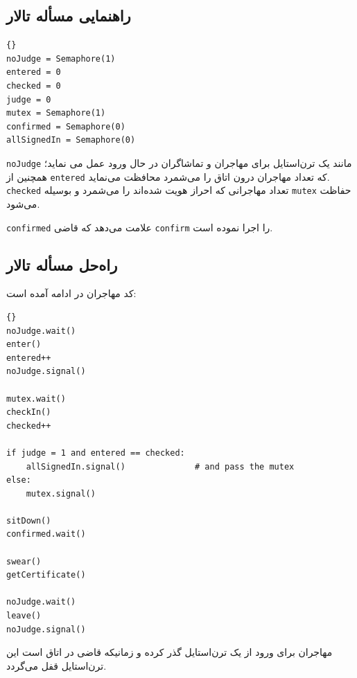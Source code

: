 \documentclass{book}
\newcommand{\clearemptydoublepage}{}%
\begin{document}
\clearemptydoublepage
\subsection{راهنمایی مسأله تالار }

\begin{latin}
\begin{lstlisting}[title=\rl{راهنمایی مسأله تالار \lr{Faneuil}}]{}
noJudge = Semaphore(1)
entered = 0
checked = 0
judge = 0
mutex = Semaphore(1)
confirmed = Semaphore(0)
allSignedIn = Semaphore(0)
\end{lstlisting}
\end{latin}


    {\tt noJudge} 
    مانند یک ترن‌استایل برای مهاجران و تماشاگران در حال ورود عمل می نماید؛ همچنین از {\tt entered} که تعداد مهاجران درون اتاق را می‌شمرد 
    محافظت می‌نماید.  {\tt checked} تعداد مهاجرانی که احراز هویت شده‌اند را می‌شمرد و بوسیله {\tt mutex} حفاظت می‌شود. 

    {\tt confirmed}
    علامت می‌دهد که قاضی {\tt confirm} را اجرا نموده است. 

\clearemptydoublepage
\subsection{راه‌حل مسأله تالار }

    کد مهاجران در ادامه آمده است:

\begin{latin}
\begin{lstlisting}[title=\rl{راهنمایی مسأله تالار \lr{Faneuil} (مهاجر)}]{}
noJudge.wait()
enter()
entered++
noJudge.signal()

mutex.wait()
checkIn()
checked++

if judge = 1 and entered == checked:
    allSignedIn.signal()              # and pass the mutex
else:
    mutex.signal()

sitDown()
confirmed.wait()

swear()
getCertificate()

noJudge.wait()
leave()
noJudge.signal()
\end{lstlisting}
\end{latin}

    مهاجران برای ورود از یک ترن‌استایل گذر کرده و زمانیکه قاضی در اتاق است این ترن‌استایل قفل می‌گردد.
\end{document}
